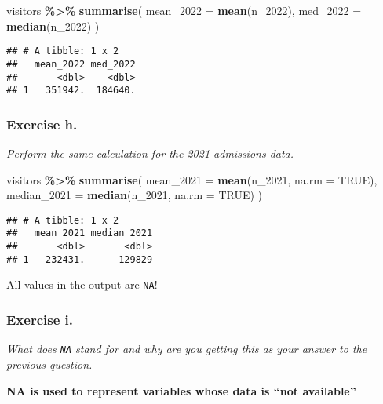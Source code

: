 \documentclass[
]{article}
\newenvironment{Shaded}{\begin{snugshade}}{\end{snugshade}}
\newcommand{\AttributeTok}[1]{\textcolor[rgb]{0.13,0.29,0.53}{#1}}
\newcommand{\ConstantTok}[1]{\textcolor[rgb]{0.56,0.35,0.01}{#1}}
\newcommand{\FunctionTok}[1]{\textcolor[rgb]{0.13,0.29,0.53}{\textbf{#1}}}
\newcommand{\NormalTok}[1]{#1}
\newcommand{\SpecialCharTok}[1]{\textcolor[rgb]{0.81,0.36,0.00}{\textbf{#1}}}
\begin{document}
\begin{Shaded}
\begin{Highlighting}[]
\NormalTok{visitors }\SpecialCharTok{\%\textgreater{}\%} 
  \FunctionTok{summarise}\NormalTok{(}
    \AttributeTok{mean\_2022 =} \FunctionTok{mean}\NormalTok{(n\_2022),}
    \AttributeTok{med\_2022 =} \FunctionTok{median}\NormalTok{(n\_2022)}
\NormalTok{  )}
\end{Highlighting}
\end{Shaded}

\begin{verbatim}
## # A tibble: 1 x 2
##   mean_2022 med_2022
##       <dbl>    <dbl>
## 1   351942.  184640.
\end{verbatim}

\subsubsection{Exercise h.}\label{exercise-h.}

\emph{Perform the same calculation for the 2021 admissions data.}

\begin{Shaded}
\begin{Highlighting}[]
\NormalTok{visitors }\SpecialCharTok{\%\textgreater{}\%} 
  \FunctionTok{summarise}\NormalTok{(}
    \AttributeTok{mean\_2021 =} \FunctionTok{mean}\NormalTok{(n\_2021, }\AttributeTok{na.rm =} \ConstantTok{TRUE}\NormalTok{),}
    \AttributeTok{median\_2021 =} \FunctionTok{median}\NormalTok{(n\_2021, }\AttributeTok{na.rm =} \ConstantTok{TRUE}\NormalTok{)}
\NormalTok{  )}
\end{Highlighting}
\end{Shaded}

\begin{verbatim}
## # A tibble: 1 x 2
##   mean_2021 median_2021
##       <dbl>       <dbl>
## 1   232431.      129829
\end{verbatim}

All values in the output are \texttt{NA}!

\subsubsection{Exercise i.}\label{exercise-i.}

\emph{What does \texttt{NA} stand for and why are you getting this as
your answer to the previous question.}

\textbf{NA is used to represent variables whose data is ``not
available''}
\end{document}
